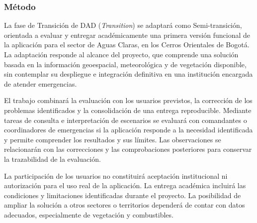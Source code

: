 \subsubsection{Método}\label{sec:transicion-metodo}

La fase de Transición de DAD (\textit{Transition}) se adaptará
como Semi-transición, orientada a evaluar y entregar académicamente
una primera versión funcional de la aplicación para el sector de
Aguas Claras, en los Cerros Orientales de Bogotá. La adaptación
responde al alcance del proyecto, que comprende una solución
basada en la información geoespacial, meteorológica y de vegetación
disponible, sin contemplar su despliegue e integración definitiva
en una institución encargada de atender emergencias.

El trabajo combinará la evaluación con los usuarios previstos,
la corrección de los problemas identificados y la consolidación
de una entrega reproducible. Mediante tareas de consulta e
interpretación de escenarios se evaluará con comandantes o
coordinadores de emergencias si la aplicación responde a la
necesidad identificada y permite comprender los resultados y sus
límites. Las observaciones se relacionarán con las correcciones y
las comprobaciones posteriores para conservar la trazabilidad
de la evaluación.

La participación de los usuarios no constituirá aceptación
institucional ni autorización para el uso real de la aplicación.
La entrega académica incluirá las condiciones y limitaciones
identificadas durante el proyecto. La posibilidad de ampliar la
solución a otros sectores o territorios dependerá de contar con
datos adecuados, especialmente de vegetación y combustibles.